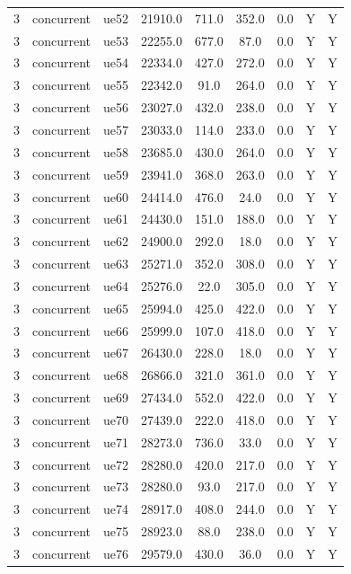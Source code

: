 \begin{table}[ht]
\begin{tabular}{|c|c|c|c|c|c|c|c|c|}
3 & concurrent & ue52 & 21910.0 & 711.0 & 352.0 & 0.0 & Y & Y \\
3 & concurrent & ue53 & 22255.0 & 677.0 & 87.0 & 0.0 & Y & Y \\
3 & concurrent & ue54 & 22334.0 & 427.0 & 272.0 & 0.0 & Y & Y \\
3 & concurrent & ue55 & 22342.0 & 91.0 & 264.0 & 0.0 & Y & Y \\
3 & concurrent & ue56 & 23027.0 & 432.0 & 238.0 & 0.0 & Y & Y \\
3 & concurrent & ue57 & 23033.0 & 114.0 & 233.0 & 0.0 & Y & Y \\
3 & concurrent & ue58 & 23685.0 & 430.0 & 264.0 & 0.0 & Y & Y \\
3 & concurrent & ue59 & 23941.0 & 368.0 & 263.0 & 0.0 & Y & Y \\
3 & concurrent & ue60 & 24414.0 & 476.0 & 24.0 & 0.0 & Y & Y \\
3 & concurrent & ue61 & 24430.0 & 151.0 & 188.0 & 0.0 & Y & Y \\
3 & concurrent & ue62 & 24900.0 & 292.0 & 18.0 & 0.0 & Y & Y \\
3 & concurrent & ue63 & 25271.0 & 352.0 & 308.0 & 0.0 & Y & Y \\
3 & concurrent & ue64 & 25276.0 & 22.0 & 305.0 & 0.0 & Y & Y \\
3 & concurrent & ue65 & 25994.0 & 425.0 & 422.0 & 0.0 & Y & Y \\
3 & concurrent & ue66 & 25999.0 & 107.0 & 418.0 & 0.0 & Y & Y \\
3 & concurrent & ue67 & 26430.0 & 228.0 & 18.0 & 0.0 & Y & Y \\
3 & concurrent & ue68 & 26866.0 & 321.0 & 361.0 & 0.0 & Y & Y \\
3 & concurrent & ue69 & 27434.0 & 552.0 & 422.0 & 0.0 & Y & Y \\
3 & concurrent & ue70 & 27439.0 & 222.0 & 418.0 & 0.0 & Y & Y \\
3 & concurrent & ue71 & 28273.0 & 736.0 & 33.0 & 0.0 & Y & Y \\
3 & concurrent & ue72 & 28280.0 & 420.0 & 217.0 & 0.0 & Y & Y \\
3 & concurrent & ue73 & 28280.0 & 93.0 & 217.0 & 0.0 & Y & Y \\
3 & concurrent & ue74 & 28917.0 & 408.0 & 244.0 & 0.0 & Y & Y \\
3 & concurrent & ue75 & 28923.0 & 88.0 & 238.0 & 0.0 & Y & Y \\
3 & concurrent & ue76 & 29579.0 & 430.0 & 36.0 & 0.0 & Y & Y \\

\end{tabular}
\end{table}
